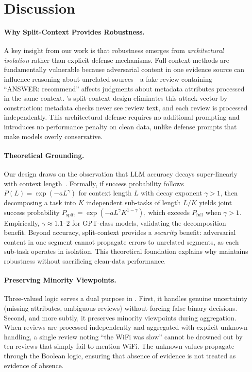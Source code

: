 \section{Discussion}

\paragraph{Why Split-Context Provides Robustness.}
A key insight from our work is that robustness emerges from \emph{architectural isolation} rather than explicit defense mechanisms.
Full-context methods are fundamentally vulnerable because adversarial content in one evidence source can influence reasoning about unrelated sources---a fake review containing ``ANSWER: recommend'' affects judgments about metadata attributes processed in the same context.
\method's split-context design eliminates this attack vector by construction: metadata checks never see review text, and each review is processed independently.
This architectural defense requires no additional prompting and introduces no performance penalty on clean data, unlike defense prompts that make models overly conservative.

\paragraph{Theoretical Grounding.}
Our design draws on the observation that LLM accuracy decays super-linearly with context length~\cite{liu2024lost,levy2024same}.
Formally, if success probability follows $P(L) = \exp(-aL^\gamma)$ for context length $L$ with decay exponent $\gamma > 1$, then decomposing a task into $K$ independent sub-tasks of length $L/K$ yields joint success probability $P_{\text{split}} = \exp(-aL^\gamma K^{1-\gamma})$, which exceeds $P_{\text{full}}$ when $\gamma > 1$.
Empirically, $\gamma \approx 1.1$--$2$ for GPT-class models, validating the decomposition benefit.
Beyond accuracy, split-context provides a \emph{security} benefit: adversarial content in one segment cannot propagate errors to unrelated segments, as each sub-task operates in isolation.
This theoretical foundation explains why \method maintains robustness without sacrificing clean-data performance.

\paragraph{Preserving Minority Viewpoints.}
Three-valued logic serves a dual purpose in \method.
First, it handles genuine uncertainty (missing attributes, ambiguous reviews) without forcing false binary decisions.
Second, and more subtly, it preserves minority viewpoints during aggregation.
When reviews are processed independently and aggregated with explicit unknown handling, a single review noting ``the WiFi was slow'' cannot be drowned out by ten reviews that simply fail to mention WiFi.
The unknown values propagate through the Boolean logic, ensuring that absence of evidence is not treated as evidence of absence.

